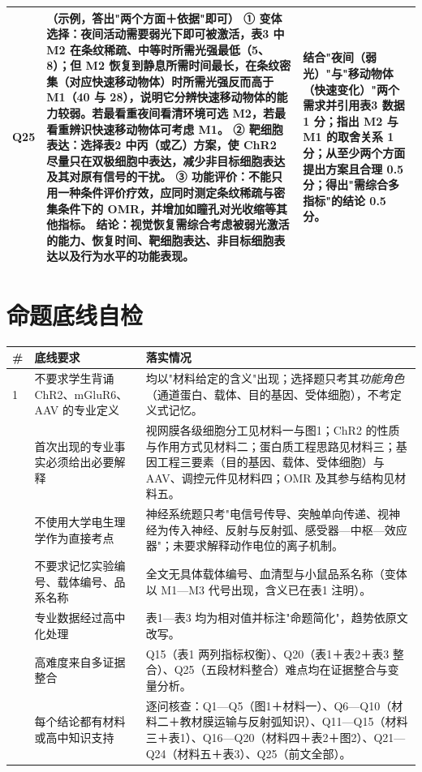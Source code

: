 \documentclass[UTF8,a4paper,11pt]{ctexart}
\begin{document}
\begin{longtable}{@{}p{0.85cm}p{9.7cm}p{4.2cm}@{}}
\addlinespace
Q25 & \textbf{（示例，答出"两个方面＋依据"即可）}\newline
\textbf{① 变体选择}：夜间活动需要弱光下即可被激活，表3 中 M2 在条纹稀疏、中等时所需光强最低（5、8）；但 M2 恢复到静息所需时间最长，在条纹密集（对应快速移动物体）时所需光强反而高于 M1（40 与 28），说明它分辨快速移动物体的能力较弱。若最看重夜间看清环境可选 M2，若最看重辨识快速移动物体可考虑 M1。\newline
\textbf{② 靶细胞表达}：选择表2 中丙（或乙）方案，使 ChR2 尽量只在双极细胞中表达，减少非目标细胞表达及其对原有信号的干扰。\newline
\textbf{③ 功能评价}：不能只用一种条件评价疗效，应同时测定条纹稀疏与密集条件下的 OMR，并增加如瞳孔对光收缩等其他指标。\newline
\textbf{结论}：视觉恢复需综合考虑被弱光激活的能力、恢复时间、靶细胞表达、非目标细胞表达以及行为水平的功能表现。 & 结合"夜间（弱光）"与"移动物体（快速变化）"两个需求并引用表3 数据 1 分；指出 M2 与 M1 的取舍关系 1 分；从至少两个方面提出方案且合理 0.5 分；得出"需综合多指标"的结论 0.5 分。 \\
\bottomrule
\end{longtable}

\section*{命题底线自检}

\begin{longtable}{@{}p{0.6cm}p{6.0cm}p{8.2cm}@{}}
\toprule
\textbf{\#} & \textbf{底线要求} & \textbf{落实情况} \\
\midrule
\endhead
1 & 不要求学生背诵 ChR2、mGluR6、AAV 的专业定义 & 均以"材料给定的含义"出现；选择题只考其\emph{功能角色}（通道蛋白、载体、目的基因、受体细胞），不考定义式记忆。 \\
\addlinespace
2 & 首次出现的专业事实必须给出必要解释 & 视网膜各级细胞分工见材料一与图1；ChR2 的性质与作用方式见材料二；蛋白质工程思路见材料三；基因工程三要素（目的基因、载体、受体细胞）与 AAV、调控元件见材料四；OMR 及其参与结构见材料五。 \\
\addlinespace
3 & 不使用大学电生理学作为直接考点 & 神经系统题只考"电信号传导、突触单向传递、视神经为传入神经、反射与反射弧、感受器—中枢—效应器"；未要求解释动作电位的离子机制。 \\
\addlinespace
4 & 不要求记忆实验编号、载体编号、品系名称 & 全文无具体载体编号、血清型与小鼠品系名称（变体以 M1—M3 代号出现，含义已在表1 注明）。 \\
\addlinespace
5 & 专业数据经过高中化处理 & 表1—表3 均为相对值并标注"命题简化"，趋势依原文改写。 \\
\addlinespace
6 & 高难度来自多证据整合 & Q15（表1 两列指标权衡）、Q20（表1＋表2＋表3 整合）、Q25（五段材料整合）难点均在证据整合与变量分析。 \\
\addlinespace
7 & 每个结论都有材料或高中知识支持 & 逐问核查：Q1—Q5（图1＋材料一）、Q6—Q10（材料二＋教材膜运输与反射弧知识）、Q11—Q15（材料三＋表1）、Q16—Q20（材料四＋表2＋图2）、Q21—Q24（材料五＋表3）、Q25（前文全部）。 \\
\bottomrule
\end{longtable}
\end{document}
